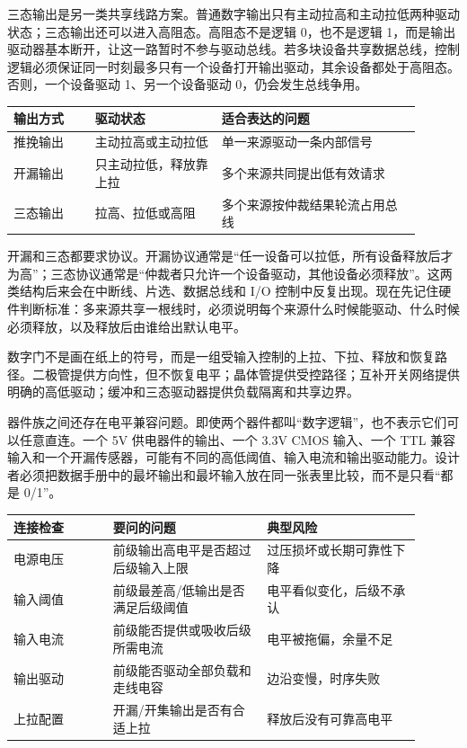 三态输出是另一类共享线路方案。普通数字输出只有主动拉高和主动拉低两种驱动状态；三态输出还可以进入高阻态。高阻态不是逻辑 0，也不是逻辑 1，而是输出驱动器基本断开，让这一路暂时不参与驱动总线。若多块设备共享数据总线，控制逻辑必须保证同一时刻最多只有一个设备打开输出驱动，其余设备都处于高阻态。否则，一个设备驱动 1、另一个设备驱动 0，仍会发生总线争用。

\begin{longtable}{L{0.18\linewidth}L{0.28\linewidth}L{0.44\linewidth}}
\toprule
输出方式 & 驱动状态 & 适合表达的问题 \\
\midrule
推挽输出 & 主动拉高或主动拉低 & 单一来源驱动一条内部信号 \\
开漏输出 & 只主动拉低，释放靠上拉 & 多个来源共同提出低有效请求 \\
三态输出 & 拉高、拉低或高阻 & 多个来源按仲裁结果轮流占用总线 \\
\bottomrule
\end{longtable}

开漏和三态都要求协议。开漏协议通常是“任一设备可以拉低，所有设备释放后才为高”；三态协议通常是“仲裁者只允许一个设备驱动，其他设备必须释放”。这两类结构后来会在中断线、片选、数据总线和 I/O 控制中反复出现。现在先记住硬件判断标准：多来源共享一根线时，必须说明每个来源什么时候能驱动、什么时候必须释放，以及释放后由谁给出默认电平。

数字门不是画在纸上的符号，而是一组受输入控制的上拉、下拉、释放和恢复路径。二极管提供方向性，但不恢复电平；晶体管提供受控路径；互补开关网络提供明确的高低驱动；缓冲和三态驱动器提供负载隔离和共享边界。

器件族之间还存在电平兼容问题。即使两个器件都叫“数字逻辑”，也不表示它们可以任意直连。一个 5V 供电器件的输出、一个 3.3V CMOS 输入、一个 TTL 兼容输入和一个开漏传感器，可能有不同的高低阈值、输入电流和输出驱动能力。设计者必须把数据手册中的最坏输出和最坏输入放在同一张表里比较，而不是只看“都是 0/1”。

\begin{longtable}{L{0.22\linewidth}L{0.34\linewidth}L{0.34\linewidth}}
\toprule
连接检查 & 要问的问题 & 典型风险 \\
\midrule
电源电压 & 前级输出高电平是否超过后级输入上限 & 过压损坏或长期可靠性下降 \\
输入阈值 & 前级最差高/低输出是否满足后级阈值 & 电平看似变化，后级不承认 \\
输入电流 & 前级能否提供或吸收后级所需电流 & 电平被拖偏，余量不足 \\
输出驱动 & 前级能否驱动全部负载和走线电容 & 边沿变慢，时序失败 \\
上拉配置 & 开漏/开集输出是否有合适上拉 & 释放后没有可靠高电平 \\
\bottomrule
\end{longtable}

